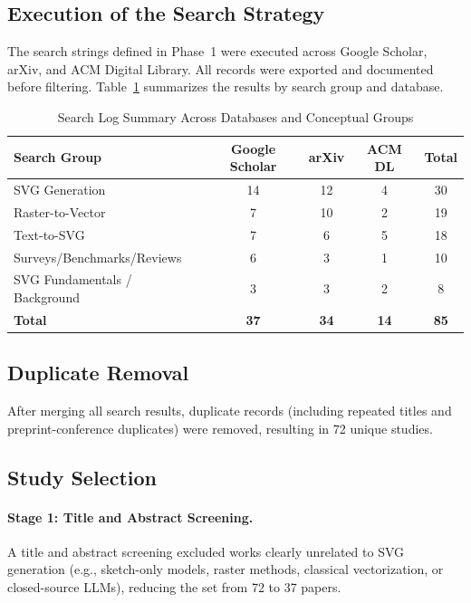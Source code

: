 \subsection{Execution of the Search Strategy}

The search strings defined in Phase~1 were executed across Google Scholar, arXiv, and ACM Digital Library. All records were exported and documented before filtering. Table~\ref{tab:searchlog} summarizes the results by search group and database.

\begin{table}[h!]
\centering
\caption{Search Log Summary Across Databases and Conceptual Groups}
\label{tab:searchlog}
\begin{tabular}{lcccc}
\hline
\textbf{Search Group} & \textbf{Google Scholar} & \textbf{arXiv} & \textbf{ACM DL} & \textbf{Total} \\
\hline
SVG Generation          & 14 & 12 & 4 & 30 \\
Raster-to-Vector        & 7  & 10 & 2 & 19 \\
Text-to-SVG             & 7  & 6  & 5 & 18 \\
Surveys/Benchmarks/Reviews & 6  & 3  & 1 & 10 \\
SVG Fundamentals / Background & 3  & 3  & 2 & 8 \\
\hline
\textbf{Total}          & \textbf{37} & \textbf{34} & \textbf{14} & \textbf{85} \\
\hline
\end{tabular}
\end{table}

\subsection{Duplicate Removal}

After merging all search results, duplicate records (including repeated titles and preprint-conference duplicates) were removed, resulting in 72 unique studies.

\subsection{Study Selection}

\paragraph{Stage 1: Title and Abstract Screening.}
A title and abstract screening excluded works clearly unrelated to SVG generation (e.g., sketch-only models, raster methods, classical vectorization, or closed-source LLMs), reducing the set from 72 to 37 papers.

